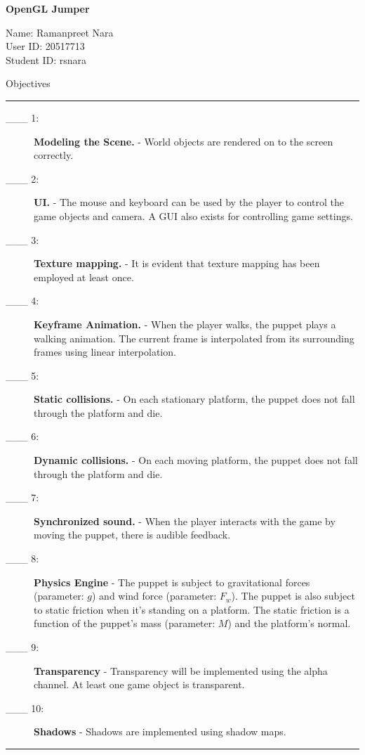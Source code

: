 \documentclass{article}
\newcommand\projecttitle{OpenGL Jumper}
\newcommand\myname{Ramanpreet Nara}
\newcommand\myuserid{20517713}
\newcommand\mystudentid{rsnara}
\begin{document}
\newpage

{\huge \bf
	\projecttitle
}

\medskip
Name: \myname \\
User ID: \myuserid \\
Student ID: \mystudentid

\bigskip
{\Large Objectives}

\hrule
\begin{description}
        \item[\_\_\_ 1:]
          \textbf{Modeling the Scene.} - World objects are rendered on to the screen correctly.

        \item[\_\_\_ 2:]
		  \textbf{UI.} - The mouse and keyboard can be used by the player to control the game objects and camera. A GUI also exists for controlling game settings.


        \item[\_\_\_ 3:]
		  \textbf{Texture mapping.} - It is evident that texture mapping has been employed at least once.


        \item[\_\_\_ 4:]
		  \textbf{Keyframe Animation.} - When the player walks, the puppet plays a walking animation. The current frame is interpolated from its surrounding frames using linear interpolation.


        \item[\_\_\_ 5:]
		  \textbf{Static collisions.} - On each stationary platform, the puppet does not fall through the platform and die.


        \item[\_\_\_ 6:]
	      \textbf{Dynamic collisions.} - On each moving platform, the puppet does not fall through the platform and die.


        \item[\_\_\_ 7:]
		  \textbf{Synchronized sound.} - When the player interacts with the game by moving the puppet, there is audible feedback.


        \item[\_\_\_ 8:]
		  \textbf{Physics Engine} - The puppet is subject to gravitational forces (parameter: $g$) and wind force (parameter: $F_w$). The puppet is also subject to static friction when it's standing on a platform. The static friction is a function of the puppet's mass (parameter: $M$) and the platform's normal.


        \item[\_\_\_ 9:]
		  \textbf{Transparency} - Transparency will be implemented using the alpha channel. At least one game object is transparent.


        \item[\_\_\_ 10:]
		  \textbf{Shadows} - Shadows are implemented using shadow maps.


\end{description}

\hrule
\end{document}
